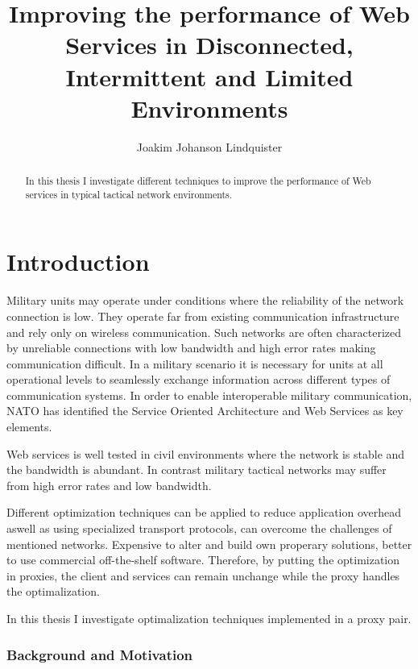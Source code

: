 \documentclass[USenglish]{article}
\title{Improving the performance of Web Services in Disconnected, Intermittent and Limited Environments}
\author{Joakim Johanson Lindquister}
\begin{document}
\ififorside{}

\begin{abstract}
In this thesis I investigate different techniques to improve the performance of Web services in typical tactical network environments.
\end{abstract}
\pagebreak

\tableofcontents
\listoftables
\listoffigures

\pagebreak


\part{Introduction}
Military units may operate under conditions where the reliability of the network connection is low. They operate far from existing communication infrastructure and rely only on wireless communication. Such networks are often characterized by unreliable connections with low bandwidth and high error rates making communication difficult. In a military scenario it is necessary for units at all operational levels to seamlessly exchange information across different types of communication systems. In order to enable interoperable military communication, NATO has identified the Service Oriented Architecture and Web Services as key elements\cite{nnec-study}.

Web services is well tested in civil environments where the network is stable and the bandwidth is abundant. In contrast military tactical networks may suffer from high error rates and low bandwidth.

Different optimization techniques can be applied to reduce application overhead aswell as using specialized transport protocols, can overcome the challenges of mentioned networks. 
Expensive to alter and build own properary solutions, better to use commercial off-the-shelf software. Therefore, by putting the optimization in proxies, the client and services can remain unchange while the proxy handles the optimalization.

In this thesis I investigate optimalization techniques implemented in a proxy pair.

\section{Background and Motivation}
\end{document}
